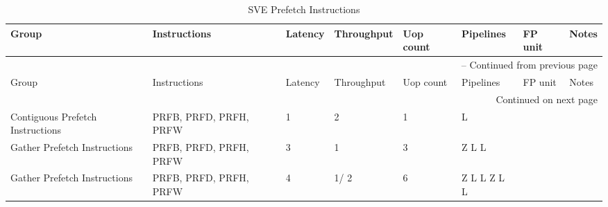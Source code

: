 \begin{longtable}{|p{1in}|p{1in}|l|l|l|p{1in}|l|p{1in}|}
\caption{SVE Prefetch Instructions} \\
\hline
Group & Instructions & Latency & Throughput & Uop count & Pipelines & FP unit & Notes\\
\hline
\endfirsthead
\hline
\multicolumn{8}{|r|}{{\tablename\ \thetable{} -- Continued from previous page}} \\
\hline
Group & Instructions & Latency & Throughput & Uop count & Pipelines & FP unit & Notes\\
\hline
\endhead
\hline
\multicolumn{8}{|r|}{{Continued on next page}} \\
\hline
\endfoot
\hline
\endlastfoot
Contiguous Prefetch Instructions & PRFB, PRFD, PRFH, PRFW & 1 & 2 & 1 & L &  & \\
\hline
Gather Prefetch Instructions & PRFB, PRFD, PRFH, PRFW & 3 & 1 & 3 & Z L L &  & \\
\hline
Gather Prefetch Instructions & PRFB, PRFD, PRFH, PRFW & 4 & 1/ 2 & 6 & Z L L Z L L &  & \\
\hline
\end{longtable}
\newpage
